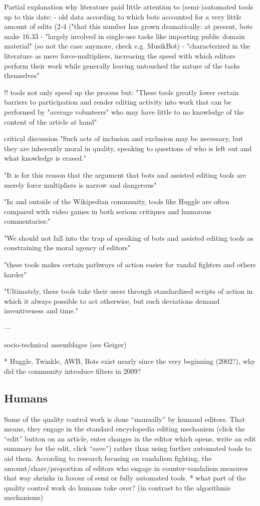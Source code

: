\cite{GeiRib2010}
Partial explanation why literature paid little attention to (semi-)automated tools up to this date:
- old data according to which bots accounted for a very little amount of edits (2-4%
  ("that this number has grown
dramatically: at present, bots make 16.33%
- "largely involved in single-use tasks like importing public domain material" (so not the case anymore, check e.g. MusikBot)
- "characterized in the literature as mere force-multipliers,
increasing the speed with which editors perform their work
while generally leaving untouched the nature of the tasks
themselves"

!! tools not only speed up the process but:
"These tools greatly lower certain barriers to participation and render editing
activity into work that can be performed by "average
volunteers" who may have little to no knowledge of the
content of the article at hand"

critical discussion
"Such acts of inclusion and exclusion may be necessary, but
they are inherently moral in quality, speaking to questions of
who is left out and what knowledge is erased."

"It is for
this reason that the argument that bots and assisted editing
tools are merely force multipliers is narrow and dangerous"

"In and outside of the Wikipedian community, tools
like Huggle are often compared with video games in both
serious critiques and humorous commentaries:"

"We should not fall into the trap of speaking of bots and
assisted editing tools as constraining the moral agency of
editors"

"these tools makes certain pathways of action easier for vandal
fighters and others harder"

"Ultimately, these tools take their users
through standardized scripts of action in which it always
possible to act otherwise, but such deviations demand
inventiveness and time."

---

socio-technical assemblages (see Geiger)

* Huggle, Twinkle, AWB, Bots exist nearly since the very beginning (2002?), why did the community introduce filters in 2009?

\subsection{Humans}

Some of the quality control work is done ``manually'' by humand editors.
That means, they engage in the standard encyclopedia editing mechanism (click the ``edit'' button on an article, enter changes in the editor which opens, write an edit summary for the edit, click ``save'') rather than using further automated tools to aid them.
According to research focusing on vandalism fighting, the amount/share/proportion of editors who engage in counter-vandalism measures that way shrinks in favour of semi or fully automated tools. %
* what part of the quality control work do humans take over? (in contrast to the algorithmic mechanisms)

